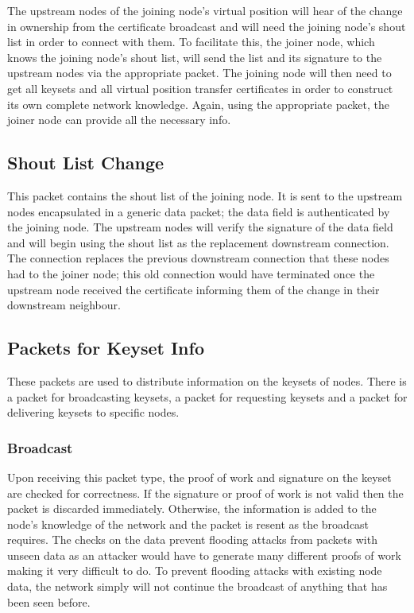 \documentclass[ %
                    author={Luke Murray},
                supervisor={Dr. Simon Hollis},
                     title={Shadow Peer-to-Peer Networks},
                  subtitle={},
                    degree={MEng},
                      year={2013} ]{thesis}
\begin{document}
The upstream nodes of the joining node's virtual position will hear of the change in ownership from the certificate broadcast and will need the joining node's shout list in order to connect with them. To facilitate this, the joiner node, which knows the joining node's shout list, will send the list and its signature to the upstream nodes via the appropriate packet. The joining node will then need to get all keysets and all virtual position transfer certificates in order to construct its own complete network knowledge. Again, using the appropriate packet, the joiner node can provide all the necessary info.

\subsection{Shout List Change}

This packet contains the shout list of the joining node. It is sent to the upstream nodes encapsulated in a generic data packet; the data field is authenticated by the joining node. The upstream nodes will verify the signature of the data field and will begin using the shout list as the replacement downstream connection. The connection replaces the previous downstream connection that these nodes had to the joiner node; this old connection would have terminated once the upstream node received the certificate informing them of the change in their downstream neighbour.

\subsection{Packets for Keyset Info}
\label{keysetinfo}

These packets are used to distribute information on the keysets of nodes. There is a packet for broadcasting keysets, a packet for requesting keysets and a packet for delivering keysets to specific nodes.

\subsubsection{Broadcast}

Upon receiving this packet type, the proof of work and signature on the keyset are checked for correctness. If the signature or proof of work is not valid then the packet is discarded immediately. Otherwise, the information is added to the node's knowledge of the network and the packet is resent as the broadcast requires. The checks on the data prevent flooding attacks from packets with unseen data as an attacker would have to generate many different proofs of work making it very difficult to do. To prevent flooding attacks with existing node data, the network simply will not continue the broadcast of anything that has been seen before.
\end{document}
